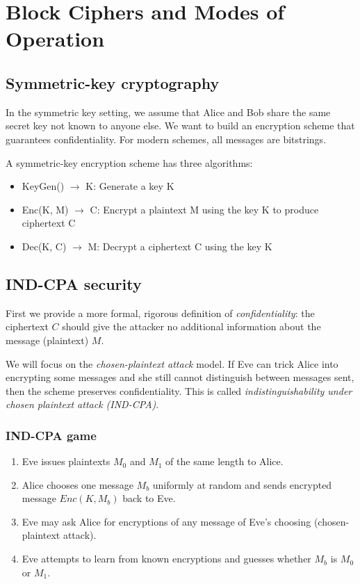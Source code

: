 \chapter{Block Ciphers and Modes of Operation}

\section{Symmetric-key cryptography}
In the symmetric key setting, we assume that Alice and Bob share the same secret key not known to anyone else. We want to build an encryption scheme that guarantees confidentiality. For modern schemes, all messages are bitstrings.

\medskip
A symmetric-key encryption scheme has three algorithms:
\begin{itemize}
    \item KeyGen() $\rightarrow$ K: Generate a key K
    \item Enc(K, M) $\rightarrow$ C: Encrypt a plaintext M using the key K to produce ciphertext C
    \item Dec(K, C) $\rightarrow$ M: Decrypt a ciphertext C using the key K
\end{itemize}

\section{IND-CPA security}
First we provide a more formal, rigorous definition of \emph{confidentiality}: the ciphertext $C$ should give the attacker no additional information about the message (plaintext) $M$.

\medskip

We will focus on the \emph{chosen-plaintext attack} model. If Eve can trick Alice into encrypting some messages and she still cannot distinguish between messages sent, then the scheme preserves confidentiality. This is called \emph{indistinguishability under chosen plaintext attack (IND-CPA)}.

\subsection{IND-CPA game}
\begin{enumerate}
    \item Eve issues plaintexts $M_0$ and $M_1$ of the same length to Alice.
    \item Alice chooses one message $M_b$ uniformly at random and sends encrypted message $Enc(K, M_b)$ back to Eve.
    \item Eve may ask Alice for encryptions of any message of Eve's choosing (chosen-plaintext attack).
    \item Eve attempts to learn from known encryptions and guesses whether $M_b$ is $M_0$ or $M_1$.
\end{enumerate}

